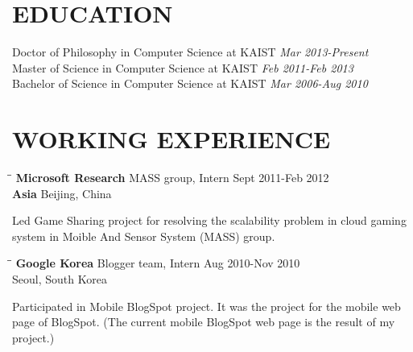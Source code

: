 \documentclass{res}
\begin{document}
\begin{resume}

\section{EDUCATION}          

   Doctor of Philosophy in Computer Science at KAIST \textit{Mar 2013-Present}\\
   Master of Science in Computer Science at KAIST \textit{Feb 2011-Feb 2013}\\
   Bachelor of Science in Computer Science at KAIST \textit{Mar 2006-Aug 2010}

\section{WORKING EXPERIENCE}

   \vspace{0.1in}
   \begin{tabbing}
   \hspace{2.3in}\= \hspace{2.6in}\= \kill %
    \textbf{\large Microsoft Research} \>MASS group, Intern        \>Sept 2011-Feb 2012\\
    \textbf{\large Asia} \>Beijing, China
   \end{tabbing}\vspace{-20pt}
    Led Game Sharing project for resolving the scalability problem in cloud gaming system
    in Moible And Sensor System (MASS) group.
   \begin{tabbing}
   \hspace{2.3in}\= \hspace{2.6in}\= \kill %
    \textbf{\large Google Korea} \>Blogger team, Intern     \>Aug 2010-Nov 2010\\
                        \>Seoul, South Korea
   \end{tabbing}\vspace{-20pt}      %
   Participated in Mobile BlogSpot project.
   It was the project for the mobile web page of BlogSpot.
   (The current mobile BlogSpot web page is the result of my project.)


\end{resume}
\end{document}
